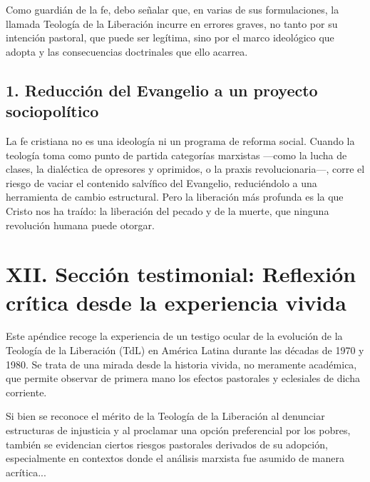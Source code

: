 \documentclass[12pt]{article}
\begin{document}
Como guardián de la fe, debo señalar que, en varias de sus formulaciones, la llamada Teología de la Liberación incurre en errores graves, no tanto por su intención pastoral, que puede ser legítima, sino por el marco ideológico que adopta y las consecuencias doctrinales que ello acarrea.

\subsection*{1. Reducción del Evangelio a un proyecto sociopolítico}
La fe cristiana no es una ideología ni un programa de reforma social. Cuando la teología toma como punto de partida categorías marxistas —como la lucha de clases, la dialéctica de opresores y oprimidos, o la praxis revolucionaria—, corre el riesgo de vaciar el contenido salvífico del Evangelio, reduciéndolo a una herramienta de cambio estructural. Pero la liberación más profunda es la que Cristo nos ha traído: la liberación del pecado y de la muerte, que ninguna revolución humana puede otorgar.

\section*{XII. Sección testimonial: Reflexión crítica desde la experiencia vivida}
Este apéndice recoge la experiencia de un testigo ocular de la evolución de la Teología de la Liberación (TdL) en América Latina durante las décadas de 1970 y 1980. Se trata de una mirada desde la historia vivida, no meramente académica, que permite observar de primera mano los efectos pastorales y eclesiales de dicha corriente.

Si bien se reconoce el mérito de la Teología de la Liberación al denunciar estructuras de injusticia y al proclamar una opción preferencial por los pobres, también se evidencian ciertos riesgos pastorales derivados de su adopción, especialmente en contextos donde el análisis marxista fue asumido de manera acrítica...
\end{document}
